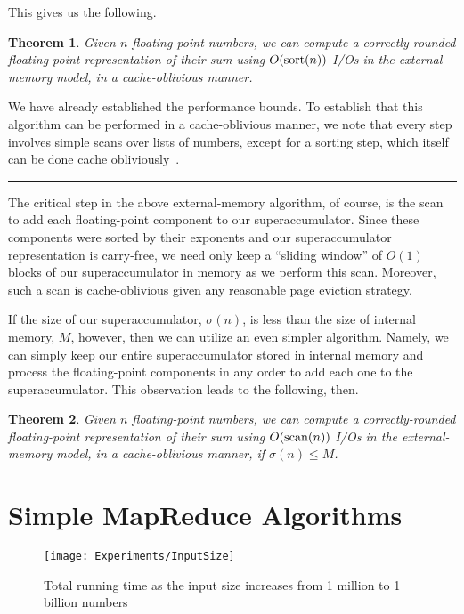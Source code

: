 \documentclass[11pt]{article}
\newtheorem{theorem}{Theorem}\newtheorem{lemma}[theorem]{Lemma}
\newenvironment{proof}{\noindent{\bf Proof:}}{\hspace*{\fill}\rule{6pt}{6pt}\bigskip}
\begin{document}
This gives us the following.

\begin{theorem}
Given $n$ floating-point numbers, we can compute a correctly-rounded
floating-point representation of their sum using $O({\rm sort}(n))$
I/Os in the external-memory model, in a cache-oblivious manner.
\end{theorem}
\begin{proof}
We have already established the performance bounds. To establish that
this algorithm can be performed in a cache-oblivious manner, we note
that every step involves simple scans over lists of numbers, except
for a sorting step, which itself can be 
done cache obliviously~\cite{f814600}.
\end{proof}

The critical step in the above external-memory algorithm, of course, is the
scan to add each floating-point component to our superaccumulator.
Since these components were sorted by their exponents and our superaccumulator
representation is carry-free, we need only keep a ``sliding window'' of 
$O(1)$ blocks of our superaccumulator in memory as we perform this scan.
Moreover, such a scan is cache-oblivious given any reasonable page
eviction strategy.

If the size of our superaccumulator, $\sigma(n)$, is less than the size
of internal memory, $M$, however, then we can utilize an even simpler 
algorithm.
Namely, we can simply keep our entire superaccumulator stored in internal
memory and process the floating-point components in any order to add
each one to the superaccumulator. This observation leads to the following,
then.

\begin{theorem}
Given $n$ floating-point numbers, we can compute a correctly-rounded
floating-point representation of their sum using $O({\rm scan}(n))$
I/Os in the external-memory model, 
in a cache-oblivious manner, if $\sigma(n)\le M$.
\end{theorem}

 


\section{Simple MapReduce Algorithms}
\label{sec:mapreduce}

\begin{figure*}[t]
	\centering
		\texttt{[image: Experiments/InputSize]}
	\caption{Total running time as the input size increases from 1 million to 1 billion numbers}
	\label{fig:InputSize}
\end{figure*}
\end{document}
